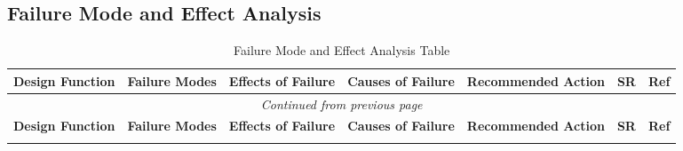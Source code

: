 \documentclass{article}
\begin{document}
\begin{landscape}

\section{Failure Mode and Effect Analysis}

\begin{longtable}{|p{3cm}|p{4cm}|p{5cm}|p{5cm}|p{5cm}|p{1cm}|p{0.75cm}|}
    \caption{Failure Mode and Effect Analysis Table} \label{tab:long} \\
    
    \hline
    \multicolumn{1}{|c|}{\textbf{Design Function}} & 
    \multicolumn{1}{c|}{\textbf{Failure Modes}} & 
    \multicolumn{1}{c|}{\textbf{Effects of Failure}} & 
    \multicolumn{1}{c|}{\textbf{Causes of Failure}} & 
    \multicolumn{1}{c|}{\textbf{Recommended Action}} & 
    \multicolumn{1}{c|}{\textbf{SR}} & 
    \multicolumn{1}{c|}{\textbf{Ref}} \\
    \hline
    \endfirsthead
    
    \hline
    \multicolumn{7}{|c|}{\textit{Continued from previous page}} \\
    \hline
    \multicolumn{1}{|c|}{\textbf{Design Function}} & 
    \multicolumn{1}{c|}{\textbf{Failure Modes}} & 
    \multicolumn{1}{c|}{\textbf{Effects of Failure}} & 
    \multicolumn{1}{c|}{\textbf{Causes of Failure}} & 
    \multicolumn{1}{c|}{\textbf{Recommended Action}} & 
    \multicolumn{1}{c|}{\textbf{SR}} & 
    \multicolumn{1}{c|}{\textbf{Ref}} \\
    \hline
    \endhead
    
    \hline
    \endfoot
    

\end{longtable}
\end{landscape}
\end{document}
